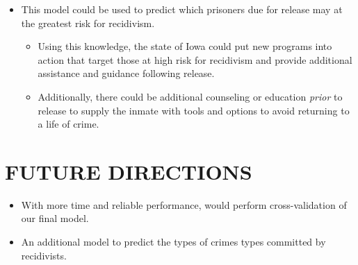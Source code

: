 \documentclass[11pt]{article}
\providecommand{\tightlist}{%
      \setlength{\itemsep}{0pt}\setlength{\parskip}{0pt}}
\begin{document}
\begin{itemize}
\tightlist
\item
  This model could be used to predict which prisoners due for release
  may at the greatest risk for recidivism.

  \begin{itemize}
  \tightlist
  \item
    Using this knowledge, the state of Iowa could put new programs into
    action that target those at high risk for recidivism and provide
    additional assistance and guidance following release.
  \item
    Additionally, there could be additional counseling or education
    \emph{prior} to release to supply the inmate with tools and options
    to avoid returning to a life of crime.
  \end{itemize}
\end{itemize}

\hypertarget{future-directions}{%
\section{FUTURE DIRECTIONS}\label{future-directions}}

\begin{itemize}
\tightlist
\item
  With more time and reliable performance, would perform
  cross-validation of our final model.
\item
  An additional model to predict the types of crimes types committed by
  recidivists.
\end{itemize}


    
    
    
    
\end{document}
